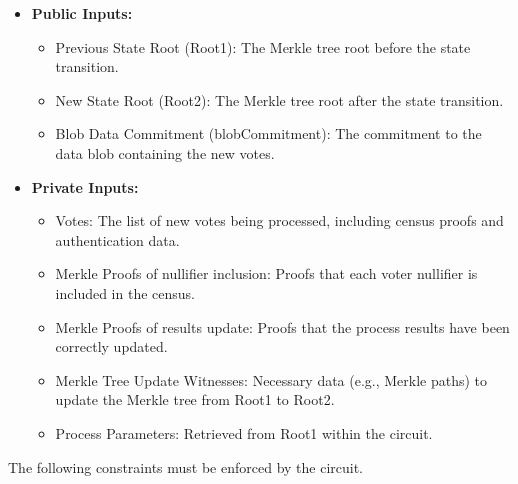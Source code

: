 \begin{itemize}
	\item \textbf{Public Inputs:}
	\begin{itemize}
		\item Previous State Root (Root1): The Merkle tree root before the state transition.
		\item New State Root (Root2): The Merkle tree root after the state transition.
		\item Blob Data Commitment (blobCommitment): The commitment to the data blob containing the new votes.
	\end{itemize}
	\item \textbf{Private Inputs:}	
	\begin{itemize}
		\item Votes: The list of new votes being processed, including census proofs and authentication data.
		\item Merkle Proofs of nullifier inclusion: Proofs that each voter nullifier is included in the census.
		\item Merkle Proofs of results update: Proofs that the process results have been correctly updated.
		\item Merkle Tree Update Witnesses: Necessary data (e.g., Merkle paths) to update the Merkle tree from Root1 to Root2.
		\item Process Parameters: Retrieved from Root1 within the circuit.
	\end{itemize}
\end{itemize}

\begin{figure}[H]
	\centering
\end{figure}

The following constraints must be enforced by the circuit.

